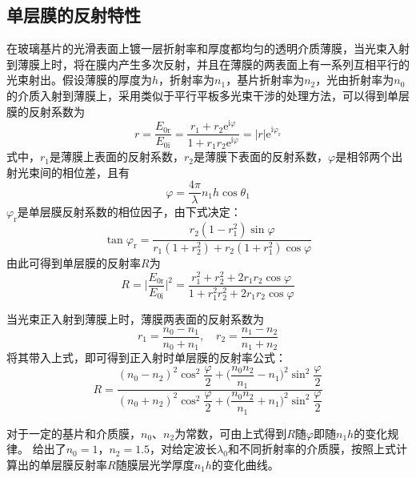 \documentclass[cn,10pt,chinesefont=founder,math=mtpro2,cite=super,toc=onecol,twoside]{elegantbook}
\begin{document}
\subsection{单层膜的反射特性}
在玻璃基片的光滑表面上镀一层折射率和厚度都均匀的透明介质薄膜，当光束入射到薄膜上时，将在膜内产生多次反射，并且在薄膜的两表面上有一系列互相平行的光束射出。假设薄膜的厚度为$h$，折射率为$n_1$，基片折射率为$n_2$，光由折射率为$n_0$的介质入射到薄膜上，采用类似于平行平板多光束干涉的处理方法，可以得到单层膜的反射系数为
\begin{equation}
r=\frac{E_{\mathrm{0r}}}{E_{\mathrm{0i}}}=\frac{r_1+r_2\mathrm{e}^{\mathrm{i}\varphi}}{1+r_1r_2\mathrm{e}^{\mathrm{i}\varphi}}=|r|\mathrm{e}^{\mathrm{i}\varphi_{\mathrm{r}}}
\end{equation}
式中，$r_1$是薄膜上表面的反射系数，$r_2$是薄膜下表面的反射系数，$\varphi$是相邻两个出射光束间的相位差，且有
\begin{equation}
\varphi=\frac{4\pi}{\lambda}n_1h\cos\theta_1
\end{equation}
$\varphi_{\mathrm{r}}$是单层膜反射系数的相位因子，由下式决定：
\begin{equation}
\tan\varphi_{\mathrm{r}}=\frac{r_2(1-r^2_1)\sin\varphi}{r_1(1+r^2_2)+r_2(1+r^2_1)\cos\varphi}
\end{equation}
由此可得到单层膜的反射率$R$为
\begin{equation}
R=\bigg|\frac{E_{0\mathrm{r}}}{E_{0\mathrm{i}}}\bigg|^2=\frac{r^2_1+r^2_2+2r_1r_2\cos\varphi}{1+r^2_1r^2_2+2r_1r_2\cos\varphi}
\end{equation}

当光束正入射到薄膜上时，薄膜两表面的反射系数为
\begin{equation}
r_1=\frac{n_0-n_1}{n_0+n_1},\quad r_2=\frac{n_1-n_2}{n_1+n_2}
\end{equation}
将其带入上式，即可得到正入射时单层膜的反射率公式：
\begin{equation}
R=\frac{(n_0-n_2)^2\cos^2\dfrac{\varphi}{2}+\bigg(\dfrac{n_0n_2}{n_1}-n_1\bigg)^2\sin^2\dfrac{\varphi}{2}}{(n_0+n_2)^2\cos^2\dfrac{\varphi}{2}+\bigg(\dfrac{n_0n_2}{n_1}+n_1\bigg)^2\sin^2\dfrac{\varphi}{2}}
\label{eq:reflectivity-of-monolayer}
\end{equation}

对于一定的基片和介质膜，$n_0$、$n_2$为常数，可由上式得到$R$随$\varphi$即随$n_1h$的变化规律。 给出了$n_0=1$，$n_2=1.5$，对给定波长$\lambda_0$和不同折射率的介质膜，按照上式计算出的单层膜反射率$R$随膜层光学厚度$n_1h$的变化曲线。
\end{document}
